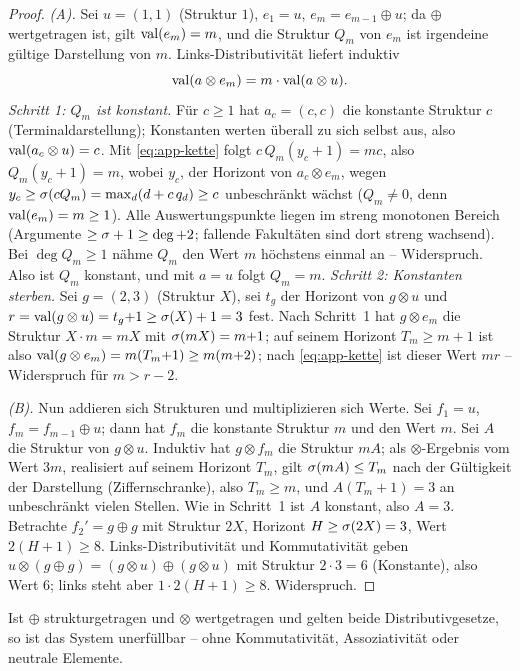 \begin{proof}
\emph{(A).} Sei $u=(1,1)$ (Struktur $1$), $e_1=u$,
$e_m=e_{m-1}\oplus u$; da $\oplus$ wertgetragen ist, gilt
$\operatorname{val}(e_m)=m$, und die Struktur $Q_m$ von $e_m$ ist irgendeine
gültige Darstellung von $m$. Links-Distributivität liefert induktiv
\begin{equation}\label{eq:app-kette}
\operatorname{val}(a\otimes e_m)=m\cdot\operatorname{val}(a\otimes u).
\end{equation}
\emph{Schritt 1: $Q_m$ ist konstant.} Für $c\ge1$ hat $a_c=(c,c)$
die konstante Struktur $c$ (Terminaldarstellung); Konstanten werten
überall zu sich selbst aus, also $\operatorname{val}(a_c\otimes u)=c$. Mit
\eqref{eq:app-kette} folgt $c\,Q_m(y_c{+}1)=mc$, also
$Q_m(y_c{+}1)=m$, wobei $y_c$, der Horizont von $a_c\otimes e_m$,
wegen $y_c\ge\sigma(cQ_m)=\max_d(d+c\,q_d)\ge c$ unbeschränkt
wächst ($Q_m\ne0$, denn $\operatorname{val}(e_m)=m\ge1$).
Alle Auswertungspunkte liegen im streng monotonen Bereich
(Argumente $\ge\sigma+1\ge\deg+2$; fallende Fakultäten sind dort
streng wachsend). Bei $\deg Q_m\ge1$ nähme $Q_m$ den Wert $m$
höchstens einmal an -- Widerspruch. Also ist $Q_m$ konstant, und
mit $a=u$ folgt $Q_m=m$.
\emph{Schritt 2: Konstanten sterben.} Sei $g=(2,3)$ (Struktur $X$),
sei $t_g$ der Horizont von $g\otimes u$ und
$r=\operatorname{val}(g\otimes u)=t_g{+}1\ge\sigma(X)+1=3$ fest. Nach
Schritt~1 hat $g\otimes e_m$ die Struktur $X\cdot m=mX$ mit
$\sigma(mX)=m{+}1$; auf seinem Horizont $T_m\ge m{+}1$ ist also
$\operatorname{val}(g\otimes e_m)=m(T_m{+}1)\ge m(m{+}2)$; nach
\eqref{eq:app-kette} ist dieser Wert $mr$ -- Widerspruch für
$m>r-2$.

\emph{(B).} Nun addieren sich Strukturen und multiplizieren sich
Werte. Sei $f_1=u$, $f_m=f_{m-1}\oplus u$; dann hat $f_m$ die
konstante Struktur $m$ und den Wert $m$. Sei $A$ die Struktur von
$g\otimes u$. Induktiv hat $g\otimes f_m$ die Struktur $mA$; als
$\otimes$-Ergebnis vom Wert $3m$, realisiert auf seinem Horizont
$T_m$, gilt $\sigma(mA)\le T_m$ nach der Gültigkeit der
Darstellung (Ziffernschranke), also $T_m\ge m$, und
$A(T_m{+}1)=3$ an unbeschränkt vielen Stellen. Wie in Schritt~1 ist
$A$ konstant, also $A=3$. Betrachte $f_2'=g\oplus g$ mit Struktur
$2X$, Horizont $H\ge\sigma(2X)=3$, Wert $2(H{+}1)\ge8$.
Links-Distributivität und Kommutativität geben
$u\otimes(g\oplus g)=(g\otimes u)\oplus(g\otimes u)$ mit Struktur
$2\cdot3=6$ (Konstante), also Wert $6$; links steht aber
$1\cdot2(H{+}1)\ge8$. Widerspruch.
\end{proof}

\begin{satz}
Ist $\oplus$ strukturgetragen und $\otimes$ wertgetragen und gelten
beide Distributivgesetze, so ist das System unerfüllbar -- ohne
Kommutativität, Assoziativität oder neutrale Elemente.
\end{satz}

